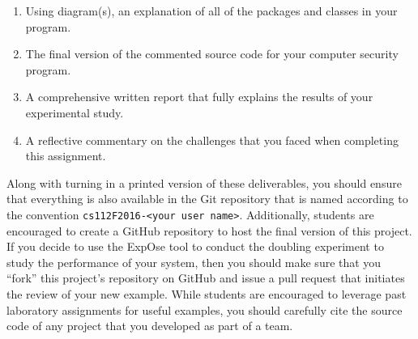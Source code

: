 \vspace*{-.1in}
\begin{enumerate}

  \itemsep0pt

  \item Using diagram(s), an explanation of all of the packages and classes in your program.

  \item The final version of the commented source code for your computer security program.

  \item A comprehensive written report that fully explains the results of your experimental study.

  \item A reflective commentary on the challenges that you faced when completing this assignment.

\end{enumerate}
\vspace*{-.1in}

Along with turning in a printed version of these deliverables, you should ensure that everything is also
available in the Git repository that is named according to the convention {\tt cs112F2016-<your user name>}.
Additionally, students are encouraged to create a GitHub repository to host the final version of this project. If you
decide to use the {\sc ExpOse} tool to conduct the doubling experiment to study the performance of your system, then you
should make sure that you ``fork'' this project's repository on GitHub and issue a pull request that initiates the
review of your new example. While students are encouraged to leverage past laboratory assignments for useful examples,
you should carefully cite the source code of any project that you developed as part of a team.



